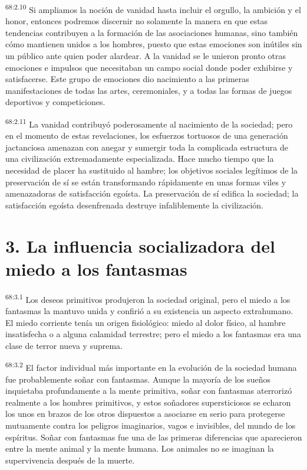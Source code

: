 \documentclass[twoside, 11pt]{book}
\begin{document}
\par
\textsuperscript{68:2.10} Si ampliamos la noción de vanidad hasta incluir el orgullo, la ambición y el honor, entonces podremos discernir no solamente la manera en que estas tendencias contribuyen a la formación de las asociaciones humanas, sino también cómo mantienen unidos a los hombres, puesto que estas emociones son inútiles sin un público ante quien poder alardear. A la vanidad se le unieron pronto otras emociones e impulsos que necesitaban un campo social donde poder exhibirse y satisfacerse. Este grupo de emociones dio nacimiento a las primeras manifestaciones de todas las artes, ceremoniales, y a todas las formas de juegos deportivos y competiciones.

\par
\textsuperscript{68:2.11} La vanidad contribuyó poderosamente al nacimiento de la sociedad; pero en el momento de estas revelaciones, los esfuerzos tortuosos de una generación jactanciosa amenazan con anegar y sumergir toda la complicada estructura de una civilización extremadamente especializada. Hace mucho tiempo que la necesidad de placer ha sustituido al hambre; los objetivos sociales legítimos de la preservación de sí se están transformando rápidamente en unas formas viles y amenazadoras de satisfacción egoísta. La preservación de sí edifica la sociedad; la satisfacción egoísta desenfrenada destruye infaliblemente la civilización.

\section*{3. La influencia socializadora del miedo a los fantasmas}
\par
\textsuperscript{68:3.1} Los deseos primitivos produjeron la sociedad original, pero el miedo a los fantasmas la mantuvo unida y confirió a su existencia un aspecto extrahumano. El miedo corriente tenía un origen fisiológico: miedo al dolor físico, al hambre insatisfecha o a alguna calamidad terrestre; pero el miedo a los fantasmas era una clase de terror nueva y suprema.

\par
\textsuperscript{68:3.2} El factor individual más importante en la evolución de la sociedad humana fue probablemente soñar con fantasmas. Aunque la mayoría de los sueños inquietaba profundamente a la mente primitiva, soñar con fantasmas aterrorizó realmente a los hombres primitivos, y estos soñadores supersticiosos se echaron los unos en brazos de los otros dispuestos a asociarse en serio para protegerse mutuamente contra los peligros imaginarios, vagos e invisibles, del mundo de los espíritus. Soñar con fantasmas fue una de las primeras diferencias que aparecieron entre la mente animal y la mente humana. Los animales no se imaginan la supervivencia después de la muerte.
\end{document}
